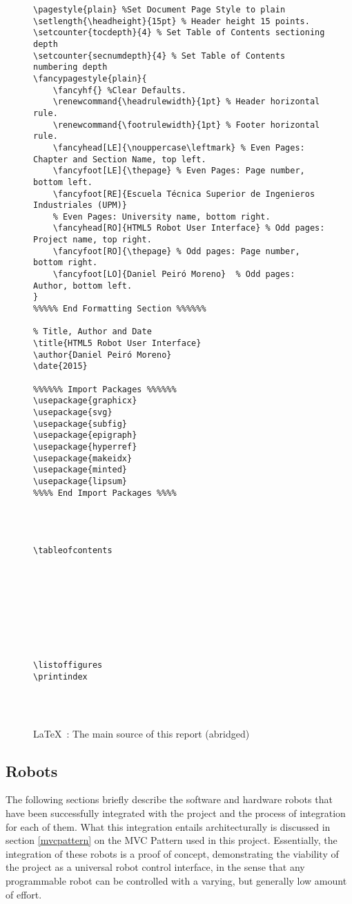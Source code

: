   \begin{figure}[H]
  
  \captionsetup{justification=centering}
  \begin{verbatim}
\pagestyle{plain} %Set Document Page Style to plain
\setlength{\headheight}{15pt} % Header height 15 points.
\setcounter{tocdepth}{4} % Set Table of Contents sectioning depth
\setcounter{secnumdepth}{4} % Set Table of Contents numbering depth
\fancypagestyle{plain}{
    \fancyhf{} %Clear Defaults.
    \renewcommand{\headrulewidth}{1pt} % Header horizontal rule.
    \renewcommand{\footrulewidth}{1pt} % Footer horizontal rule.
    \fancyhead[LE]{\nouppercase\leftmark} % Even Pages: Chapter and Section Name, top left.
    \fancyfoot[LE]{\thepage} % Even Pages: Page number, bottom left.
    \fancyfoot[RE]{Escuela Técnica Superior de Ingenieros Industriales (UPM)} 
    % Even Pages: University name, bottom right.
    \fancyhead[RO]{HTML5 Robot User Interface} % Odd pages: Project name, top right.
    \fancyfoot[RO]{\thepage} % Odd pages: Page number, bottom right.
    \fancyfoot[LO]{Daniel Peiró Moreno}  % Odd pages: Author, bottom left.
}
%%%%% End Formatting Section %%%%%%

% Title, Author and Date
\title{HTML5 Robot User Interface}
\author{Daniel Peiró Moreno}
\date{2015}

%%%%%% Import Packages %%%%%%
\usepackage{graphicx}
\usepackage{svg}
\usepackage{subfig}
\usepackage{epigraph}
\usepackage{hyperref}
\usepackage{makeidx}
\usepackage{minted}
\usepackage{lipsum}
%%%% End Import Packages %%%%




\tableofcontents









\listoffigures
\printindex




  \end{verbatim}
  \caption{\LaTeX\ : The main source of this report (abridged)}
  \end{figure}
\subsection{Robots}
The following sections briefly describe the software and hardware robots that have been successfully integrated with the project and the
process of integration for each of them. What this integration entails architecturally is discussed in section \ref{mvcpattern} on the
MVC Pattern used in this project. Essentially, the integration of these robots is a proof of concept, demonstrating the viability of the
project as a universal robot control interface, in the sense that any programmable robot can be controlled with a varying, but generally
low amount of effort.
